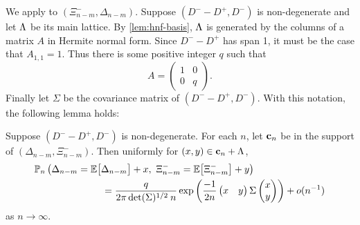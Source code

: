 We apply  to $(\Xi_{n-m}^-, \Delta_{n-m})$. Suppose $(D^- - D^+, D^-)$ is non-degenerate and let $\Lambda$ be its main lattice. By \cref{lem:hnf-basis}, $\Lambda$ is generated by the columns of a matrix $A$ in Hermite normal form. Since $D^- - D^+$ has span 1, it must be the case that $A_{1, 1} = 1$. Thus there is some positive integer $q$ such that
\begin{equation*}
    A = \begin{pmatrix}
        1 & 0 \\ 
        0 & q
    \end{pmatrix}.
\end{equation*}
Finally let $\Sigma$ be the covariance matrix of $(D^- - D^+, D^-)$. With this notation, the following lemma holds:
\begin{lemma}
    \label{lem:bivar-llt}
    Suppose $(D^- - D^+, D^-)$ is non-degenerate. For each $n$, let ${\mathbf c}_n$ be in the support of $(\Delta_{n-m}, \Xi^-_{n-m})$. Then uniformly for $(x, y) \in {\mathbf c}_n + \Lambda$,
    \begin{align*}
        &\P_n\left(
            \Delta_{n-m} = \E \big[ \Delta_{n-m} \big] + x, \ 
            \Xi^-_{n-m} = \E \big[ \Xi^-_{n-m} \big] + y
        \right)  \nonumber \\
        &\hspace{7em} = \frac{q}{2\pi \det(\Sigma)^{1/2} \: n} \exp\left( 
            \frac{-1}{2n}
            \begin{pmatrix}
                x & y
            \end{pmatrix}
            \Sigma
            \begin{pmatrix}
                x \\ y
            \end{pmatrix}
        \right)
        + \littleo( n^{-1} )
    \end{align*}
    as $n \to \infty$.
\end{lemma}
